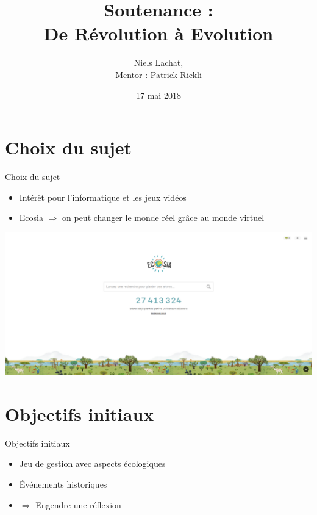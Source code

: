 \documentclass[11pt]{beamer}
\author{Niels Lachat, \\ Mentor : Patrick Rickli}
\title{Soutenance : \\ De Révolution à Evolution}
\institute{Lycée Denis-de-Rougemont}
\date{17 mai 2018}
\begin{document}
\begin{frame}
\titlepage
\end{frame}

\begin{frame}
\tableofcontents
\end{frame}

\section{Choix du sujet}

\begin{frame}{Choix du sujet}

\begin{itemize}
	\item Intérêt pour l'informatique et les jeux vidéos
	\item Ecosia $\Rightarrow$ on peut changer le monde réel grâce au monde virtuel
\end{itemize}

\begin{center}
\includegraphics[scale=.1]{../images/ecosia}
\end{center}

\end{frame}


\section{Objectifs initiaux}

\begin{frame}{Objectifs initiaux}

\begin{itemize}
	\item Jeu de gestion avec aspects écologiques
	\item Événements historiques
	\item $\Rightarrow$ Engendre une réflexion
\end{itemize}

\end{frame}
\end{document}
